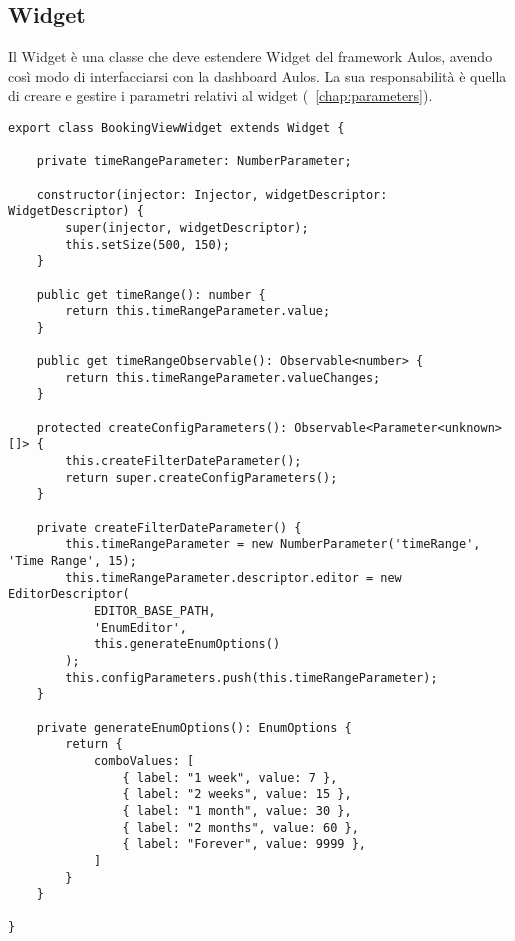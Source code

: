 \subsection{Widget}
Il Widget è una classe che deve estendere Widget del framework Aulos, avendo così modo di interfacciarsi con la dashboard Aulos. La sua responsabilità è quella di creare e gestire i parametri relativi al widget (~\ref{chap:parameters}).
\begin{lstlisting}[caption={booking-view-widget.ts},style=javascriptCode]
export class BookingViewWidget extends Widget {

    private timeRangeParameter: NumberParameter;

    constructor(injector: Injector, widgetDescriptor: WidgetDescriptor) {
        super(injector, widgetDescriptor);
        this.setSize(500, 150);
    }

    public get timeRange(): number {
        return this.timeRangeParameter.value;
    }

    public get timeRangeObservable(): Observable<number> {
        return this.timeRangeParameter.valueChanges;
    }

    protected createConfigParameters(): Observable<Parameter<unknown>[]> {
        this.createFilterDateParameter();
        return super.createConfigParameters();
    }

    private createFilterDateParameter() {
        this.timeRangeParameter = new NumberParameter('timeRange', 'Time Range', 15);
        this.timeRangeParameter.descriptor.editor = new EditorDescriptor(
            EDITOR_BASE_PATH,
            'EnumEditor',
            this.generateEnumOptions()
        );
        this.configParameters.push(this.timeRangeParameter);
    }

    private generateEnumOptions(): EnumOptions {
        return {
            comboValues: [
                { label: "1 week", value: 7 },
                { label: "2 weeks", value: 15 },
                { label: "1 month", value: 30 },
                { label: "2 months", value: 60 },
                { label: "Forever", value: 9999 },
            ]
        }
    }

}
\end{lstlisting}

